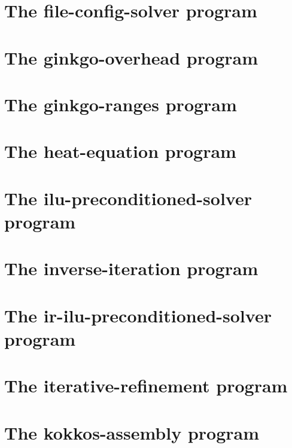 \let\mypdfximage\pdfximage\def\pdfximage{\immediate\mypdfximage}\documentclass[twoside]{book}
\newcommand{\+}{\discretionary{\mbox{\scriptsize$\hookleftarrow$}}{}{}}
\begin{document}
\chapter{The file-\/config-\/solver program}
\label{file_config_solver}

\chapter{The ginkgo-\/overhead program}
\label{ginkgo_overhead}

\chapter{The ginkgo-\/ranges program}
\label{ginkgo_ranges}

\chapter{The heat-\/equation program}
\label{heat_equation}

\chapter{The ilu-\/preconditioned-\/solver program}
\label{ilu_preconditioned_solver}

\chapter{The inverse-\/iteration program}
\label{inverse_iteration}

\chapter{The ir-\/ilu-\/preconditioned-\/solver program}
\label{ir_ilu_preconditioned_solver}

\chapter{The iterative-\/refinement program}
\label{iterative_refinement}

\chapter{The kokkos-\/assembly program}
\label{kokkos_assembly}

\end{document}
